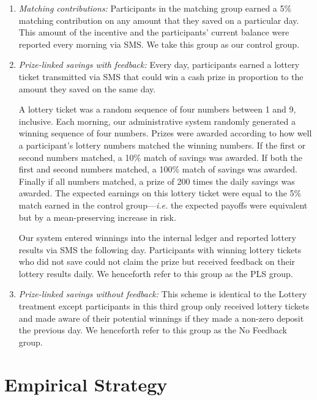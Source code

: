 \documentclass[11pt]{article}
\begin{document}
		\begin{enumerate} \setlength{\itemsep}{1pt}

			\item \textit{Matching contributions:} Participants in the matching group earned a 5\% matching contribution on any amount that they saved on a particular day. This amount of the incentive and the participants' current balance were reported every morning via SMS. We take this group as our control group.

			\item \textit{Prize-linked savings with feedback:} Every day, participants earned a lottery ticket transmitted via SMS that could win a cash prize in proportion to the amount they saved on the same day.

			A lottery ticket was a random sequence of four numbers between 1 and 9, inclusive. Each morning, our administrative system randomly generated a winning sequence of four numbers. Prizes were awarded according to how well a participant's lottery numbers matched the winning numbers. If the first or second numbers matched, a 10\% match of savings was awarded. If both the first and second numbers matched, a 100\% match of savings was awarded. Finally if all numbers matched, a prize of 200 times the daily savings was awarded. The expected earnings on this lottery ticket were equal to the 5\% match earned in the control group---\textit{i.e.} the expected payoffs were equivalent but by a mean-preserving increase in risk.

			Our system entered winnings into the internal ledger and reported lottery results via SMS the following day. Participants with winning lottery tickets who did not save could not claim the prize but received feedback on their lottery results daily. We henceforth refer to this group as the PLS group. 

			\item \textit{Prize-linked savings without feedback:} This scheme is identical to the Lottery treatment except participants in this third group only received lottery tickets and made aware of their potential winnings if they made a non-zero deposit the previous day. We henceforth refer to this group as the No Feedback group.

		\end{enumerate}

		

		\clearpage

\section{Empirical Strategy} \label{sec:est}
\end{document}
